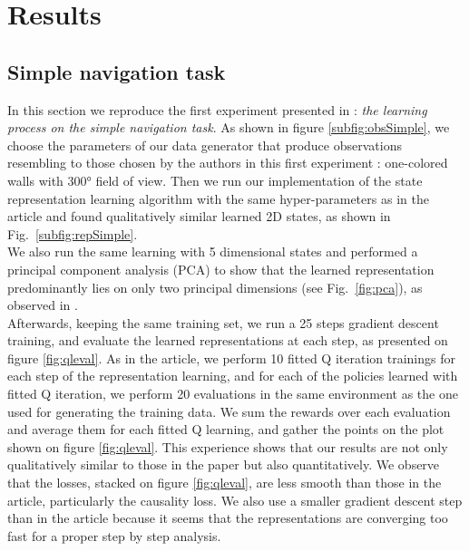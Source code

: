 \documentclass[10pt,a4paper,onecolumn]{article}
\begin{document}
\section*{Results}

\subsection*{Simple navigation task}

In this section we reproduce the first experiment presented in \cite{jonschkowski2015learning}: \textit{the learning process on the simple navigation task}. As shown in figure \ref{subfig:obsSimple}, we choose the parameters of our data generator that produce observations resembling to those chosen by the authors in this first experiment : one-colored walls with 300° field of view. Then we run our implementation of the state representation learning algorithm with the same hyper-parameters as in the article and found qualitatively similar learned 2D states, as shown in Fig.~\ref{subfig:repSimple}.\\

We also run the same learning with 5 dimensional states and performed a principal component analysis (PCA) to show that the learned representation predominantly lies on only two principal dimensions (see Fig.~\ref{fig:pca}), as observed in \cite{jonschkowski2015learning}.\\

Afterwards, keeping the same training set, we run a 25 steps gradient descent training, and evaluate the learned representations at each step, as presented on figure \ref{fig:qleval}. As in the article, we perform 10 fitted Q iteration trainings for each step of the representation learning, and for each of the policies learned with fitted Q iteration, we perform 20 evaluations in the same environment as the one used for generating the training data. We sum the rewards over each evaluation and average them for each fitted Q learning, and gather the points on the plot shown on figure \ref{fig:qleval}. This experience shows that our results are not only qualitatively similar to those in the paper but also quantitatively. We observe that the losses, stacked on figure \ref{fig:qleval}, are less smooth than those in the article, particularly the causality loss. We also use a smaller gradient descent step than in the article because it seems that the representations are converging too fast for a proper step by step analysis.
\end{document}
